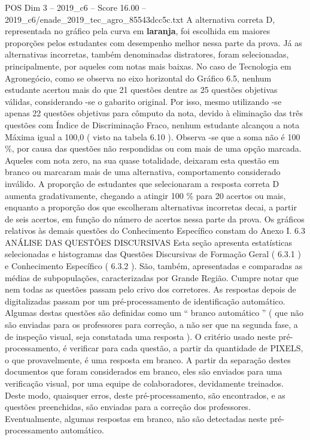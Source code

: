 \begin{textsample}{POS Dim 3 – 2019\_c6 – Score 16.00 – 2019\_c6/enade\_2019\_tec\_agro\_85543dcc5c.txt}
A alternativa correta D, representada no gráfico pela curva em \textbf{laranja}, foi escolhida em maiores proporções pelos estudantes com desempenho melhor nessa parte da prova.
Já as alternativas incorretas, também denominadas distratores, foram selecionadas, principalmente, por aqueles com notas mais baixas.
No caso de Tecnologia em Agronegócio, como se observa no eixo horizontal do Gráfico 6.5, nenhum estudante acertou mais do que 21 questões dentre as 25 questões objetivas válidas, considerando -se o gabarito original.
Por isso, mesmo utilizando -se apenas 22 questões objetivas para cômputo da nota, devido à eliminação das três questões com Índice de Discriminação Fraco, nenhum estudante alcançou a nota Máxima igual a 100,0 ( visto na tabela 6.10 ).
Observa -se que a soma não é 100 \%, por causa das questões não respondidas ou com mais de uma opção marcada.
Aqueles com nota zero, na sua quase totalidade, deixaram esta questão em branco ou marcaram mais de uma alternativa, comportamento considerado inválido.
A proporção de estudantes que selecionaram a resposta correta D aumenta gradativamente, chegando a atingir 100 \% para 20 acertos ou mais, enquanto a proporção dos que escolheram alternativas incorretas decai, a partir de seis acertos, em função do número de acertos nessa parte da prova.
Os gráficos relativos às demais questões do Conhecimento Específico constam do Anexo I. 6.3 ANÁLISE DAS QUESTÕES DISCURSIVAS Esta seção apresenta estatísticas selecionadas e histogramas das Questões Discursivas de Formação Geral ( 6.3.1 ) e Conhecimento Específico ( 6.3.2 ).
São, também, apresentadas e comparadas as médias de subpopulações, caracterizadas por Grande Região.
Cumpre notar que nem todas as questões passam pelo crivo dos corretores.
As respostas depois de digitalizadas passam por um pré-processamento de identificação automático.
Algumas destas questões são definidas como um “ branco automático ” ( que não são enviadas para os professores para correção, a não ser que na segunda fase, a de inspeção visual, seja constatada uma resposta ).
O critério usado neste pré-processamento, é verificar para cada questão, a partir da quantidade de PIXELS, o que provavelmente, é uma resposta em branco.
A partir da separação destes documentos que foram considerados em branco, eles são enviados para uma verificação visual, por uma equipe de colaboradores, devidamente treinados.
Deste modo, quaisquer erros, deste pré-processamento, são encontrados, e as questões preenchidas, são enviadas para a correção dos professores.
Eventualmente, algumas respostas em branco, não são detectadas neste pré-processamento automático.

\end{textsample}
